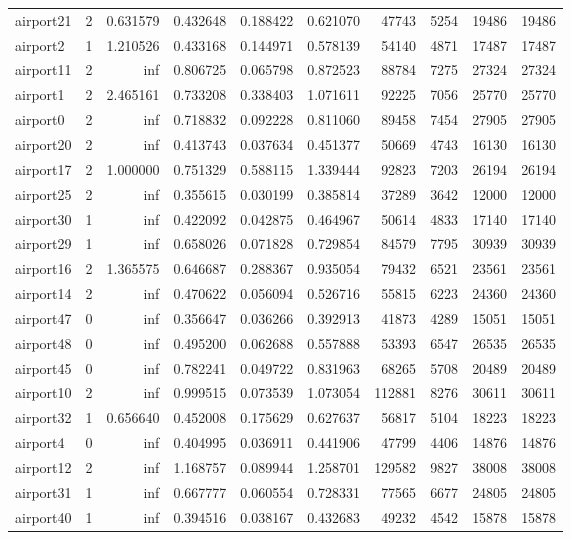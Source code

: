 \begin{longtable}{|l|r|r|r|r|r|r|r|r|r|}
airport21 & 2 & 0.631579 & 0.432648 & 0.188422 & 0.621070 & 47743 & 5254 & 19486 & 19486 \\
airport2 & 1 & 1.210526 & 0.433168 & 0.144971 & 0.578139 & 54140 & 4871 & 17487 & 17487 \\
airport11 & 2 & inf & 0.806725 & 0.065798 & 0.872523 & 88784 & 7275 & 27324 & 27324 \\
airport1 & 2 & 2.465161 & 0.733208 & 0.338403 & 1.071611 & 92225 & 7056 & 25770 & 25770 \\
airport0 & 2 & inf & 0.718832 & 0.092228 & 0.811060 & 89458 & 7454 & 27905 & 27905 \\
airport20 & 2 & inf & 0.413743 & 0.037634 & 0.451377 & 50669 & 4743 & 16130 & 16130 \\
airport17 & 2 & 1.000000 & 0.751329 & 0.588115 & 1.339444 & 92823 & 7203 & 26194 & 26194 \\
airport25 & 2 & inf & 0.355615 & 0.030199 & 0.385814 & 37289 & 3642 & 12000 & 12000 \\
airport30 & 1 & inf & 0.422092 & 0.042875 & 0.464967 & 50614 & 4833 & 17140 & 17140 \\
airport29 & 1 & inf & 0.658026 & 0.071828 & 0.729854 & 84579 & 7795 & 30939 & 30939 \\
airport16 & 2 & 1.365575 & 0.646687 & 0.288367 & 0.935054 & 79432 & 6521 & 23561 & 23561 \\
airport14 & 2 & inf & 0.470622 & 0.056094 & 0.526716 & 55815 & 6223 & 24360 & 24360 \\
airport47 & 0 & inf & 0.356647 & 0.036266 & 0.392913 & 41873 & 4289 & 15051 & 15051 \\
airport48 & 0 & inf & 0.495200 & 0.062688 & 0.557888 & 53393 & 6547 & 26535 & 26535 \\
airport45 & 0 & inf & 0.782241 & 0.049722 & 0.831963 & 68265 & 5708 & 20489 & 20489 \\
airport10 & 2 & inf & 0.999515 & 0.073539 & 1.073054 & 112881 & 8276 & 30611 & 30611 \\
airport32 & 1 & 0.656640 & 0.452008 & 0.175629 & 0.627637 & 56817 & 5104 & 18223 & 18223 \\
airport4 & 0 & inf & 0.404995 & 0.036911 & 0.441906 & 47799 & 4406 & 14876 & 14876 \\
airport12 & 2 & inf & 1.168757 & 0.089944 & 1.258701 & 129582 & 9827 & 38008 & 38008 \\
airport31 & 1 & inf & 0.667777 & 0.060554 & 0.728331 & 77565 & 6677 & 24805 & 24805 \\
airport40 & 1 & inf & 0.394516 & 0.038167 & 0.432683 & 49232 & 4542 & 15878 & 15878 \\

\end{longtable}

